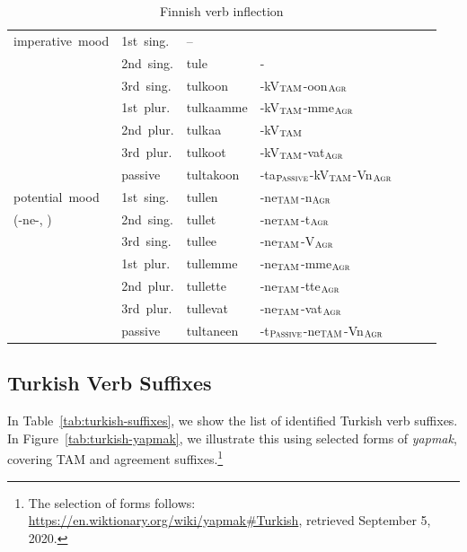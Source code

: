 \documentclass[11pt,letterpaper]{article}
\begin{document}
\begin{table}
\begin{tabular}{l|llllll}
	imperative mood  &1st sing. &	-- \\ 
	 \cite[Section 66]{karlsson1999finnish}	 & 2nd sing. &	tule & - \\ 
	&	3rd sing. &	tulkoon  & -kV$_{\textsc{TAM}}$-oon$_{\textsc{Agr}}$\\ 
	&	1st plur. &	tulkaamme  & -kV$_{\textsc{TAM}}$-mme$_{\textsc{Agr}}$\\ 
	&	2nd plur. &	tulkaa   & -kV$_{\textsc{TAM}}$\\ 
	&	3rd plur. 	&tulkoot  & -kV$_{\textsc{TAM}}$-vat$_{\textsc{Agr}}$\\ 
	&	passive 	&tultakoon  & -ta$_{\textsc{Passive}}$-kV$_{\textsc{TAM}}$-Vn$_{\textsc{Agr}}$\\ \hline
	potential mood 	 &	1st sing. &	tullen  & -ne$_{\textsc{TAM}}$-n$_{\textsc{Agr}}$\\ 
		(-ne-, \cite[Section 67]{karlsson1999finnish}) & 2nd sing. &	tullet  & -ne$_{\textsc{TAM}}$-t$_{\textsc{Agr}}$\\ 
	&	3rd sing. &	tullee  & -ne$_{\textsc{TAM}}$-V$_{\textsc{Agr}}$\\ 
	&	1st plur. &	tullemme  & -ne$_{\textsc{TAM}}$-mme$_{\textsc{Agr}}$\\ 
	&	2nd plur. &	tullette  & -ne$_{\textsc{TAM}}$-tte$_{\textsc{Agr}}$\\ 
	&	3rd plur. &	tullevat  & -ne$_{\textsc{TAM}}$-vat$_{\textsc{Agr}}$\\ 
	&	passive &	tultaneen  & -t$_{\textsc{Passive}}$-ne$_{\textsc{TAM}}$-Vn$_{\textsc{Agr}}$ \\ \hline
\end{tabular}
	\caption{Finnish verb inflection}\label{tab:finnish}
\end{table}

\subsection{Turkish Verb Suffixes}

In Table~\ref{tab:turkish-suffixes}, we show the list of identified Turkish verb suffixes.
In Figure~\ref{tab:turkish-yapmak}, we illustrate this using selected forms of \textit{yapmak}, covering TAM and agreement suffixes.\footnote{The selection of forms follows: \url{https://en.wiktionary.org/wiki/yapmak\#Turkish}, retrieved September 5, 2020.}
\end{document}
